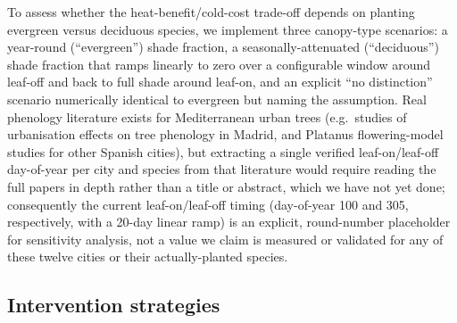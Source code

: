 \documentclass[pdflatex,sn-mathphys-ay]{sn-jnl}
\begin{document}
To assess whether the heat-benefit/cold-cost trade-off depends on planting
evergreen versus deciduous species, we implement three canopy-type scenarios:
a year-round (``evergreen'') shade fraction, a seasonally-attenuated
(``deciduous'') shade fraction that ramps linearly to zero over a
configurable window around leaf-off and back to full shade around leaf-on,
and an explicit ``no distinction'' scenario numerically identical to
evergreen but naming the assumption. Real phenology literature exists for
Mediterranean urban trees (e.g.\ studies of urbanisation effects on tree
phenology in Madrid, and Platanus flowering-model studies for other Spanish
cities), but extracting a single verified leaf-on/leaf-off day-of-year per
city and species from that literature would require reading the full papers
in depth rather than a title or abstract, which we have not yet done;
consequently the current leaf-on/leaf-off timing (day-of-year 100 and 305,
respectively, with a 20-day linear ramp) is an explicit, round-number
placeholder for sensitivity analysis, not a value we claim is measured or
validated for any of these twelve cities or their actually-planted species.

\subsection{Intervention strategies}
\label{sec:interventions}
\end{document}
